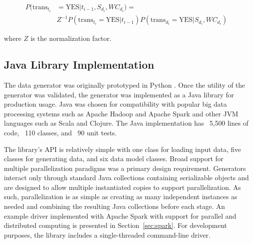 \documentclass[conference]{IEEEtran}
\begin{document}
\begin{align}
P(\text{trans}_{t_i}&=\text{YES}|t_{i-1}, S_{d_i}, WC_{d_i}) = \nonumber \\
&Z^{-1} P(\text{trans}_{t_i}=\text{YES}|t_{i-1}) P(\text{trans}_{d_i}=\text{YES} | S_{d_i}, WC_{d_i})
\end{align}
 
where $Z$ is the normalization factor.  



\subsection{Java Library Implementation}
The data generator was originally prototyped in Python \cite{Nowling14}.  Once the utility of the generator was validated, the generator was implemented as a Java library for production usage. Java was chosen for compatibility with popular big data processing systems such as Apache Hadoop \cite{Hadoop} and Apache Spark \cite{Zaharia2010,Zaharia2012} and other JVM languages such as Scala and Clojure.  The Java implementation has ~5,500 lines of code, ~110 classes, and ~90 unit tests.

The library's API is relatively simple with one class for loading input data, five classes for generating data, and six data model classes.  Broad support for multiple parallelization paradigms was a primary design requirement.  Generators interact only through standard Java collections containing serializable objects and are designed to allow multiple instantiated copies to support parallelization.  As such, parallelization is as simple as creating as many independent instances as needed and combining the resulting Java collections before each stage. An example driver implemented with Apache Spark with support for parallel and distributed computing is presented in Section~\ref{sec:spark}.  For development purposes, the library includes a single-threaded command-line driver.
\end{document}

